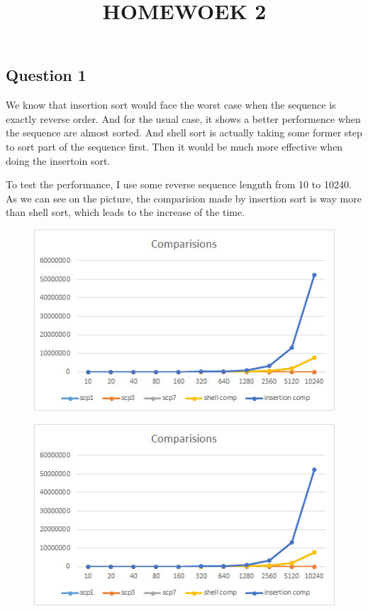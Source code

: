 \documentclass[conference]{IEEEtran}
\begin{document}
\title{HOMEWOEK 2}

\author{
}

\maketitle

\subsection*{Question 1}
We know that insertion sort would face the worst case when the sequence is 
exactly reverse order. And for the usual case, it shows a better performence
when the sequence are almost sorted. And shell sort is actually taking some 
former step to sort part of the sequence first. Then it would be much more 
effective when doing the insertoin sort.

To test the performance, I use some reverse sequence lengnth from 10 to 10240.
As we can see on the picture, the comparision made by insertion sort is way more 
than shell sort, which leads to the increase of the time.

\begin{figure}[H]
    \centerline{\includegraphics[scale=0.05]{Pic/pic1.png}}
\end{figure}

\begin{figure}[H]
    \centerline{\includegraphics[scale=0.05]{Pic/pic1.png}}
\end{figure}
\end{document}
